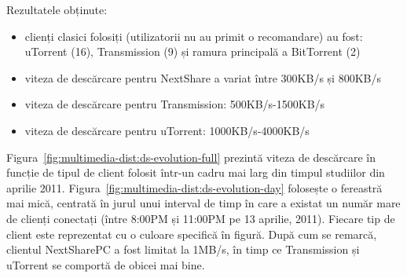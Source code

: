 
Rezultatele obținute:
\begin{itemize}
  \item clienți clasici folosiți (utilizatorii nu au primit o recomandare)
  au fost: uTorrent (16), Transmission (9) și ramura principală a BitTorrent (2)
  \item viteza de descărcare pentru NextShare a variat între 300KB/s și 800KB/s
  \item viteza de descărcare pentru Transmission: 500KB/s-1500KB/s
  \item viteza de descărcare pentru uTorrent: 1000KB/s-4000KB/s
\end{itemize}

Figura~\ref{fig:multimedia-dist:ds-evolution-full} prezintă viteza de descărcare
în funcție de tipul de client folosit într-un cadru mai larg din timpul studiilor
din aprilie 2011. Figura~\ref{fig:multimedia-dist:ds-evolution-day} folosește
o fereastră mai mică, centrată în jurul unui interval de timp în care a existat
un număr mare de clienți conectați (între 8:00PM și 11:00PM pe 13 aprilie, 2011).
Fiecare tip de client este reprezentat cu o culoare specifică în figură. După cum
se remarcă, clientul NextSharePC a fost limitat la 1MB/s, în timp ce Transmission
și uTorrent se comportă de obicei mai bine.

